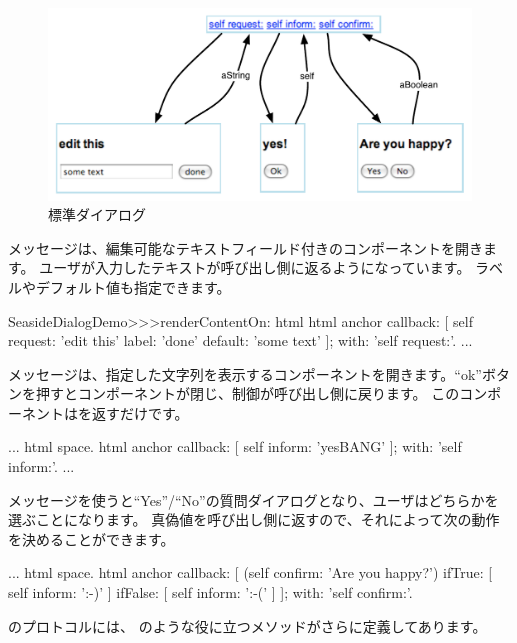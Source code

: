 \documentclass[a4paper,10pt,twoside]{book}
\begin{document}
\begin{figure}[b]
\begin{center}
\includegraphics[width=\textwidth]{dialogs}
\caption{標準ダイアログ}
\end{center}
\end{figure}

メッセージは、編集可能なテキストフィールド付きのコンポーネントを開きます。
ユーザが入力したテキストが呼び出し側に返るようになっています。
ラベルやデフォルト値も指定できます。

\begin{code}{}
SeasideDialogDemo>>>renderContentOn: html
	html anchor
		callback: [ self request: 'edit this' label: 'done' default: 'some text' ];
		with: 'self request:'.
...
\end{code}

メッセージは、指定した文字列を表示するコンポーネントを開きます。``ok''ボタンを押すとコンポーネントが閉じ、制御が呼び出し側に戻ります。
このコンポーネントはを返すだけです。

\begin{code}{}
...
	html space.
	html anchor
		callback: [ self inform: 'yesBANG' ];
		with: 'self inform:'.
...
\end{code}

メッセージを使うと``Yes''/``No''の質問ダイアログとなり、ユーザはどちらかを選ぶことになります。
真偽値を呼び出し側に返すので、それによって次の動作を決めることができます。

\begin{code}{}
...
	html space.
	html anchor
		callback: [
			(self confirm: 'Are you happy?')
				ifTrue: [ self inform: ':-)' ]
				ifFalse: [ self inform: ':-(' ]
			];
		with: 'self confirm:'.
\end{code}

のプロトコルには、 のような役に立つメソッドがさらに定義してあります。
\end{document}
